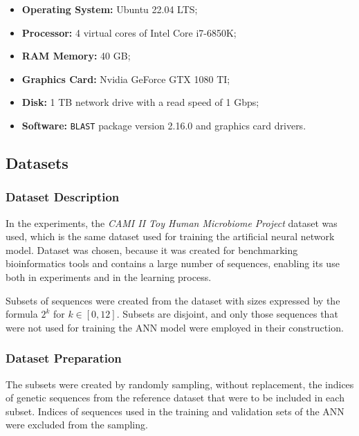 \documentclass[pdflatex,sn-vancouver-num]{sn-jnl}%
\begin{document}
            \begin{itemize}
                \item{
                    \textbf{Operating System:} Ubuntu 22.04 LTS;
                }
                \item{
                    \textbf{Processor:} 4 virtual cores of Intel Core i7-6850K;
                }
                \item{
                    \textbf{RAM Memory:} 40 GB;
                }
                \item{
                    \textbf{Graphics Card:} Nvidia GeForce GTX 1080 TI;
                }
                \item{
                    \textbf{Disk:} 1 TB network drive with a read speed of 1 Gbps;
                }
                \item{
                    \textbf{Software:} \texttt{BLAST} package version 2.16.0 and graphics card drivers.
                }
            \end{itemize}

        \subsection{Datasets}
            \subsubsection{Dataset Description}
                In the experiments, the \textit{CAMI II Toy Human Microbiome Project}\cite{Fritz:2019} dataset was used, which is the same dataset used for training the artificial neural network model. Dataset was chosen, because it was created for benchmarking bioinformatics tools and contains a large number of sequences, enabling its use both in experiments and in the learning process.

                Subsets of sequences were created from the dataset with sizes expressed by the formula $2^k$ for $k \in [0, 12]$. Subsets are disjoint, and only those sequences that were not used for training the ANN model were employed in their construction.

            \subsubsection{Dataset Preparation}
                The subsets were created by randomly sampling, without replacement, the indices of genetic sequences from the reference dataset that were to be included in each subset. Indices of sequences used in the training and validation sets of the ANN were excluded from the sampling. 
\end{document}
